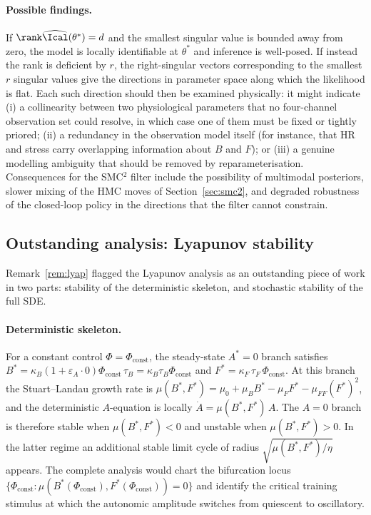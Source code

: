 \paragraph{Possible findings.} If $\rank \widehat\Ical(\theta^*) = d$ and
the smallest singular value is bounded away from zero, the model is
locally identifiable at $\theta^*$ and inference is well-posed. If
instead the rank is deficient by $r$, the right-singular vectors
corresponding to the smallest $r$ singular values give the directions in
parameter space along which the likelihood is flat. Each such direction
should then be examined physically: it might indicate (i) a
collinearity between two physiological parameters that no four-channel
observation set could resolve, in which case one of them must be fixed
or tightly priored; (ii) a redundancy in the observation model itself
(for instance, that HR and stress carry overlapping information about
$B$ and $F$); or (iii) a genuine modelling ambiguity that should be
removed by reparameterisation. Consequences for the SMC${}^2$ filter
include the possibility of multimodal posteriors, slower mixing of the
HMC moves of Section~\ref{sec:smc2}, and degraded robustness of the
closed-loop policy in the directions that the filter cannot constrain.

\subsection{Outstanding analysis: Lyapunov stability}\label{sec:discussion-lyap}

Remark~\ref{rem:lyap} flagged the Lyapunov analysis as an outstanding
piece of work in two parts: stability of the deterministic skeleton, and
stochastic stability of the full SDE.

\paragraph{Deterministic skeleton.} For a constant control
$\Phi = \Phi_{\mathrm{const}}$, the steady-state $A^*=0$ branch satisfies
\(
  B^*  = \kappa_B(1+\varepsilon_A \cdot 0)\Phi_{\mathrm{const}}\,\tau_B = \kappa_B \tau_B \Phi_{\mathrm{const}}
\)
and
\(
  F^* = \kappa_F\,\tau_F\,\Phi_{\mathrm{const}}.
\)
At this branch the Stuart--Landau growth rate is
$\mu(B^*,F^*) = \mu_0 + \mu_B B^* - \mu_F F^* - \mu_{FF} (F^*)^2$, and
the deterministic $A$-equation is locally $\dot A = \mu(B^*,F^*)\,A$.
The $A=0$ branch is therefore stable when $\mu(B^*,F^*) < 0$ and unstable
when $\mu(B^*,F^*) > 0$. In the latter regime an additional stable
limit cycle of radius $\sqrt{\mu(B^*,F^*)/\eta}$ appears. The complete
analysis would chart the bifurcation locus
$\{\Phi_{\mathrm{const}} : \mu(B^*(\Phi_{\mathrm{const}}),F^*(\Phi_{\mathrm{const}})) = 0\}$
and identify the critical training stimulus at which the autonomic
amplitude switches from quiescent to oscillatory.

